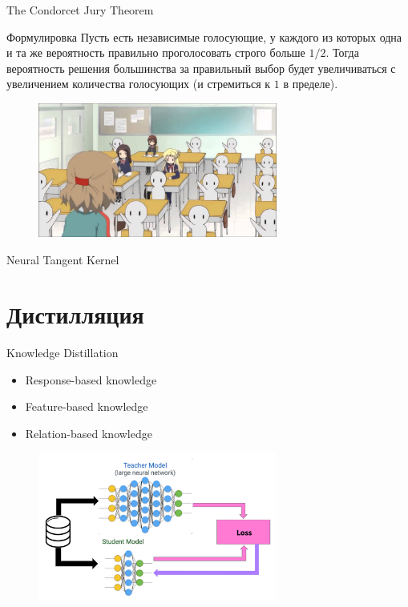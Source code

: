 \documentclass[9pt]{beamer}
\begin{document}
\begin{frame}{The Condorcet Jury Theorem}
    \begin{block}{Формулировка}
        Пусть есть независимые голосующие, у каждого из которых одна и та же вероятность правильно проголосовать строго больше $1/2$. Тогда вероятность решения большинства за правильный выбор будет увеличиваться с увеличением количества голосующих (и стремиться к $1$ в пределе).
    \end{block}

    \begin{figure}
        \centering
        \includegraphics[width=0.7\textwidth]{images/image5.jpg}
    \end{figure}
\end{frame}

\begin{frame}{Neural Tangent Kernel}
    
\end{frame}

\section{Дистилляция}

\begin{frame}{Knowledge Distillation}
    \begin{block}{}
        \begin{itemize}
            \item Response-based knowledge
            \item Feature-based knowledge
            \item Relation-based knowledge
        \end{itemize}
    \end{block}

    \begin{figure}
        \centering
        \includegraphics[width=0.7\textwidth]{images/image6.png}
    \end{figure}
\end{frame}
\end{document}

